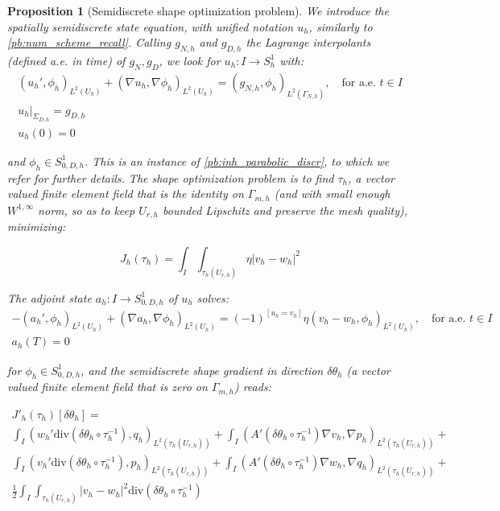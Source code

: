\documentclass[english,a4paper,10pt,oneside]{scrbook}	%
\theoremstyle{break}
\newtheorem{prop}[equation]{Proposition}
\theoremstyle{remark}
\newcommand{\te}{\theta}
\newcommand{\dive}{\text{div}}
\begin{document}
\begin{prop}[Semidiscrete shape optimization problem]
\label{prop:sd_shopt}
We introduce the spatially semidiscrete state equation, with unified notation $u_h$, similarly to \cref{pb:num_scheme_recall}. Calling $g_{N,h}$ and $g_{D,h}$ the Lagrange interpolants (defined a.e. in time) of $g_N, g_D$, we look for $u_h:I \rightarrow S^1_h$ with:
\begin{align*}
\left ( u_h', \phi_h\right)_{L^2(U_h)} + (\nabla u_h, \nabla \phi_h)_{L^2(U_h)} = (g_{N,h} , \phi_h)_{L^2(\Gamma_{N,h})}, \quad \text{for a.e. } t \in I\\
u_h|_{\Sigma_{D,h}}=g_{D,h}\\
u_h(0)=0
\end{align*}

and $\phi_h \in S^1_{0,D,h}$. This is an instance of \cref{pb:inh_parabolic_discr}, to which we refer for further details. The shape optimization problem is to find $\tau_h$, a vector valued finite element field that is the identity on $\Gamma_{m,h}$ (and with small enough $W^{1,\infty}$ norm, so as to keep $U_{r,h}$ bounded Lipschitz and preserve the mesh quality), minimizing:

$$J_h(\tau_h)=\int_I\int_{\tau_h(U_{r,h})}\eta |v_h-w_h|^2$$

The adjoint state $a_h:I \rightarrow  S^1_{0,D,h}$ of $u_h$ solves:
\begin{align*}
-\left ( a_h', \phi_h\right)_{L^2(U_h)} + (\nabla a_h, \nabla \phi_h)_{L^2(U_h)} = (-1)^{\left [ u_h=v_h\right ]}\eta(v_h-w_h, \phi_h)_{L^2(U_h)}, \quad \text{for a.e. } t \in I\\
a_h(T)=0
\end{align*}

for $\phi_h \in S^1_{0,D,h}$, and the semidiscrete shape gradient in direction $\delta \te_h$ (a vector valued finite element field that is zero on $\Gamma_{m,h}$) reads:

\begin{align*} 
	J'_h(\tau_h)[\delta \te_h] =\\ \int_I (w_h' \dive(\delta \te_h\circ  \tau_h^{-1}), q_h )_{L^2(\tau_h(U_{r,h}))}+ \int_I (A'(\delta\te_h \circ \tau_h^{-1})\nabla v_h, \nabla p_h)_{L^2(\tau_h(U_{r,h}))}+\\
\int_I (v_h' \dive(\delta \te_h\circ  \tau_h^{-1}), p_h )_{L^2(\tau_h(U_{r,h}))}+ \int_I (A'(\delta\te_h \circ \tau_h^{-1})\nabla w_h, \nabla q_h)_{L^2(\tau_h(U_{r,h}))}+\\
\frac{1}{2}\int_I\int_{\tau_h(U_{r,h})}|v_h-w_h|^2\dive(\delta \te_h\circ  \tau_h^{-1})
\end{align*}

\end{prop}
\end{document}
